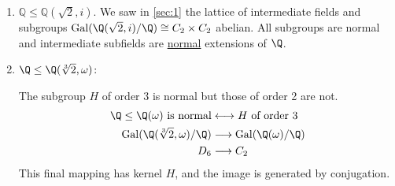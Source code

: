 \documentclass{article}
\DeclareMathOperator{\Gal}{Gal}
\begin{document}
\begin{eg} \leavevmode
    \begin{enumerate}[label=(\roman*)]
        \item $\mathbb{Q} \leq \mathbb{Q}(\sqrt{2}, i)$. We saw in \cref{sec:1} the lattice of intermediate fields and subgroups $\Gal(\Q(\sqrt{2}, i)/\Q) \cong C_2 \times C_2$ abelian.
            All subgroups are normal and intermediate subfields are \hyperlink{def:normal}{normal} extensions of $\Q$.
        \item $\Q \leq \Q(\sqrt[3]{2}, \omega)$:
            \begin{center}
            \end{center}
            The subgroup $H$ of order 3 is normal but those of order 2 are not.
            \begin{align*}
                \Q \leq \Q(\omega) \text{ is normal} &\longleftrightarrow H \text{ of order } 3 \\
                \Gal(\Q(\sqrt[3]{2}, \omega)/\Q) &\longrightarrow \Gal(\Q(\omega)/\Q) \\
                D_6 &\longrightarrow C_2
            \end{align*}
            This final mapping has kernel $H$, and the image is generated by conjugation.
    \end{enumerate}
\end{eg}
\end{document}
